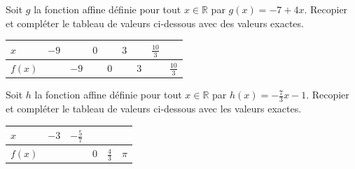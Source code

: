 \documentclass[11pt]{article}
\begin{document}
\begin{exo}
Soit $g$ la fonction affine définie pour tout $x\in\mathbb{R}$ par $g(x)=-7+4x$.
Recopier et compléter le tableau de valeurs ci-dessous avec des valeurs exactes.
\begin{center}
  \renewcommand{\arraystretch}{2}
  \begin{tabularx}{\textwidth}{|>{\centering}X|>{\centering}X|>{\centering}X|
    >{\centering}X|>{\centering}X|>{\centering}X|>{\centering}X|>{\centering}X|
    >{\centering\arraybackslash}X|}
    \hline
    $x$ & $-9$ & & $0$ & & $3$ & & $\frac{10}{3}$ & \\
    \hline
    $f(x)$ & & $-9$ & & $0$ & & $3$ & & $\frac{10}{3}$ \\
    \hline
  \end{tabularx}
\end{center}
\end{exo}

\begin{exo}
Soit $h$ la fonction affine définie pour tout $x\in\mathbb{R}$ par
$h(x)=-\frac{7}{3}x-1$. Recopier et compléter le tableau de valeurs ci-dessous
avec les valeurs exactes.
\begin{center}
\renewcommand{\arraystretch}{2}
\begin{tabularx}{\textwidth}{|Y|Y|Y|Y|Y|Y|}
 \hline
 $x$ & $-3$ & $-\frac{5}{7}$ & & & \\
 \hline
 $f(x)$ & & & $0$ & $\frac{4}{3}$ & $\pi$ \\
 \hline
\end{tabularx}
\end{center}
\end{exo}
\end{document}
